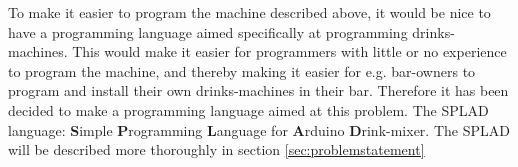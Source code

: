 To make it easier to program the machine described above, it would be nice to have a programming language aimed specifically at programming drinks-machines. This would make it easier for programmers with little or no experience to program the machine, and thereby making it easier for e.g. bar-owners to program and install their own drinks-machines in their bar. Therefore it has been decided to make a programming language aimed at this problem. The SPLAD language: \textbf{S}imple \textbf{P}rogramming \textbf{L}anguage for \textbf{A}rduino \textbf{D}rink-mixer. The SPLAD will be described more thoroughly in section \ref{sec:problemstatement}